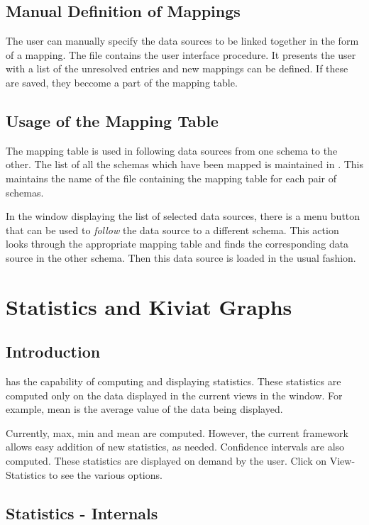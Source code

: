 \subsection{Manual Definition of Mappings}

The user can manually specify the data sources to be linked together
in the form of a mapping. The file  contains the
user interface procedure. It presents the user with a list of the
unresolved entries and new mappings can be defined. If these are
saved, they beccome a part of the mapping table.

\subsection{Usage of the Mapping Table}

The mapping table is used in following data sources from one schema to
the other. The list of all the schemas which have been mapped is
maintained in . This maintains the name of the
file containing the mapping table for each pair of schemas.

In the window displaying the list of selected data sources, there is a
menu button that can be used to {\em follow} the data source to a
different schema. This action looks through the appropriate mapping
table and finds the corresponding data source in the other
schema. Then this data source is loaded in the usual fashion.

\section{Statistics and Kiviat Graphs}

\subsection{Introduction}

\Devise has the capability of computing and displaying
statistics. These statistics are computed only on the data displayed
in the current views in the window. For example, mean is the average
 value of the data being displayed.

Currently, max, min and mean are computed.  However, the current
framework allows easy addition of new statistics, as needed.
Confidence intervals are also computed. These statistics are displayed
on demand by the user.  Click on View-Statistics to see the various
options.

\subsection{Statistics - Internals}

